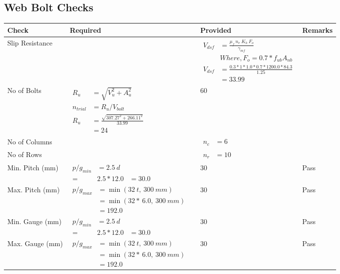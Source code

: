 \documentclass{article}%
\begin{document}
\subsection{Web Bolt Checks}%
\label{subsec:WebBoltChecks}%
\renewcommand{\arraystretch}{1.2}%
\begin{longtable}{|p{4cm}|p{5cm}|p{5.5cm}|p{1.5cm}|}%
\hline%
\rowcolor{OsdagGreen}%
Check&Required&Provided&Remarks\\%
\hline%
\endhead%
\hline%
Slip Resistance&&$\begin{aligned}V_{dsf} & = \frac{\mu_f~ n_e~  K_h~ F_o}{\gamma_{mf}}\\ & Where, F_o = 0.7 * f_{ub} A_{nb}\\ V_{dsf} & = \frac{0.3*1*1.0* 0.7 *1200.0*84.3}{1.25}\\ & =33.99\end{aligned}$&\\%
\hline%
No of Bolts&$\begin{aligned}R_{u} &= \sqrt{V_u^2+A_u^2}\\ n_{trial} &= R_u/ V_{bolt}\\ R_{u} &= \frac{\sqrt{307.27^2+266.11^2}}{33.99}\\ &=24\end{aligned}$&60&\\%
\hline%
No of Columns&&$\begin{aligned} n_c &=6\end{aligned}$&\\%
\hline%
No of Rows&&$\begin{aligned} n_r &=10\end{aligned}$&\\%
\hline%
Min. Pitch (mm)&$\begin{aligned}p/g_{min}&= 2.5 ~ d&\\ =&2.5*12.0&=30.0\end{aligned}$&30&Pass\\%
\hline%
Max. Pitch (mm)&$\begin{aligned}p/g_{max} &=\min(32~t,~300~mm)&\\ &=\min(32 *~6.0,~ 300 ~mm)\\&=192.0\end{aligned}$&30&Pass\\%
\hline%
Min. Gauge (mm)&$\begin{aligned}p/g_{min}&= 2.5 ~ d&\\ =&2.5*12.0&=30.0\end{aligned}$&30&Pass\\%
\hline%
Max. Gauge (mm)&$\begin{aligned}p/g_{max} &=\min(32~t,~300~mm)&\\ &=\min(32 *~6.0,~ 300 ~mm)\\&=192.0\end{aligned}$&30&Pass\\%

\end{longtable}
\end{document}
